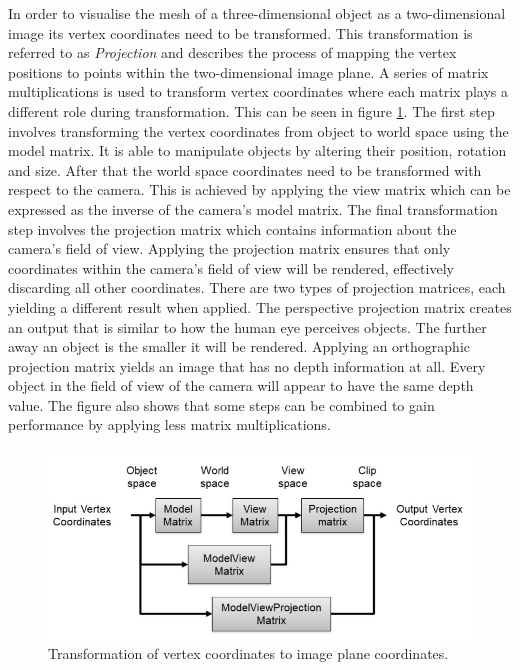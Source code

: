 In order to visualise the mesh of a three-dimensional object as a two-dimensional image its vertex coordinates need to be transformed. This transformation is referred to as \textit{Projection} and describes the process of mapping the vertex positions to points within the two-dimensional image plane. A series of matrix multiplications is used to transform vertex coordinates where each matrix plays a different role during transformation. This can be seen in figure \ref{sec:visualconcepts:camera:transform}. The first step involves transforming the vertex coordinates from object to world space using the model matrix. It is able to manipulate objects by altering their position, rotation and size. After that the world space coordinates need to be transformed with respect to the camera. This is achieved by applying the view matrix which can be expressed as the inverse of the camera's model matrix. The final transformation step involves the projection matrix which contains information about the camera's field of view. Applying the projection matrix ensures that only coordinates within the camera's field of view will be rendered, effectively discarding all other coordinates. There are two types of projection matrices, each yielding a different result when applied. The perspective projection matrix creates an output that is similar to how the human eye perceives objects. The further away an object is the smaller it will be rendered. Applying an orthographic projection matrix yields an image that has no depth information at all. Every object in the field of view of the camera will appear to have the same depth value. The figure also shows that some steps can be combined to gain performance by applying less matrix multiplications.

\begin{figure}[htb]
	\centering
	\includegraphics[width=\textwidth]{gfx/transformations.jpg}
	\caption[Transformation of vertex coordinates to image plane coordinates.]{Transformation of vertex coordinates to image plane coordinates\footnotemark.}
	\label{sec:visualconcepts:camera:transform}
\end{figure}

